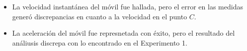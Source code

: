 \documentclass[../main]{subfiles}
\begin{document}
\begin{itemize}
  \item La velocidad instantánea del móvil fue hallada, pero el error en las medidas generó discrepancias en cuanto a la velocidad en el punto $C$.
  \item La aceleración del móvil fue represnetada con éxito, pero el resultado del análiusis discrepa con lo encontrado en el Experimento 1.
\end{itemize}
\end{document}
